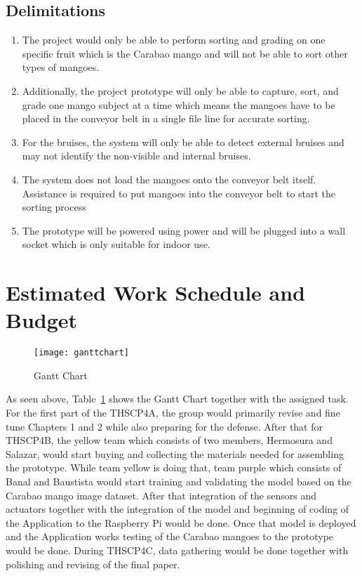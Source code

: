 \subsection{Delimitations}
\begin{enumerate}
	\item The project would only be able to perform sorting and grading on one specific fruit 
	which is the Carabao mango and will not be able to sort other types of mangoes.
	
	\item Additionally, the project prototype will only be able to capture, sort, and grade one 
	mango subject at a time which means the mangoes have to be placed in the conveyor belt in
	a single file line for accurate sorting. 
	
	\item For the bruises, the system will only be able to detect external bruises and 
	may not identify the non-visible and internal bruises.
	\item The system does not load the mangoes onto the conveyor belt itself. 
	Assistance is required to put mangoes into the conveyor belt to start the sorting process
	\item The prototype will be powered using  power and will be plugged into 
	a wall socket which is only suitable for indoor use.
\end{enumerate}


\ifFinished
\else

\section{Estimated Work Schedule and Budget}

\begin{figure}[!htbp]
	\centering
	\texttt{[image: ganttchart]}
	\caption{Gantt Chart}
	\label{fig:img2}
\end{figure}

As seen above, Table~\ref{fig:img2} shows the Gantt Chart together with the assigned task. For the
first part of the THSCP4A, the group would primarily revise and fine tune Chapters 1
and 2 while also preparing for the defense. After that for THSCP4B, the yellow team
which consists of two members, Hermosura and Salazar, would start buying and
collecting the materials needed for assembling the prototype. While team yellow is
doing that, team purple which consists of Banal and Baustista would start training and
validating the  model based on the Carabao mango image dataset. After that
integration of the sensors and actuators together with the integration of the  model
and beginning of coding of the Application to the Raspberry Pi would be done. Once
that  model is deployed and the Application works testing of the Carabao mangoes
to the prototype would be done. During THSCP4C, data gathering would be done
together with polishing and revising of the final paper.

